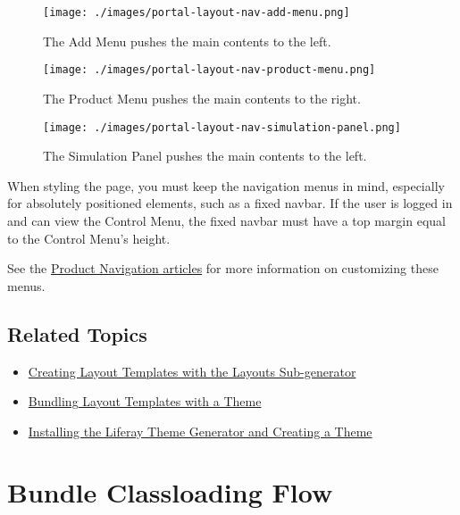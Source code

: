 \begin{figure}
\centering
\texttt{[image: ./images/portal-layout-nav-add-menu.png]}
\caption{The Add Menu pushes the main contents to the left.}
\end{figure}

\begin{figure}
\centering
\texttt{[image: ./images/portal-layout-nav-product-menu.png]}
\caption{The Product Menu pushes the main contents to the right.}
\end{figure}

\begin{figure}
\centering
\texttt{[image: ./images/portal-layout-nav-simulation-panel.png]}
\caption{The Simulation Panel pushes the main contents to the left.}
\end{figure}

When styling the page, you must keep the navigation menus in mind,
especially for absolutely positioned elements, such as a fixed navbar.
If the user is logged in and can view the Control Menu, the fixed navbar
must have a top margin equal to the Control Menu's height.

See the
\href{/docs/7-2/customization/-/knowledge_base/c/product-navigation}{Product
Navigation articles} for more information on customizing these menus.

\section{Related Topics}\label{related-topics-13}

\begin{itemize}
\tightlist
\item
  \href{/docs/7-2/reference/-/knowledge_base/r/creating-layout-templates-with-the-themes-generator}{Creating
  Layout Templates with the Layouts Sub-generator}
\item
  \href{/docs/7-2/frameworks/-/knowledge_base/f/including-layout-templates-with-a-theme}{Bundling
  Layout Templates with a Theme}
\item
  \href{/docs/7-2/reference/-/knowledge_base/r/installing-the-theme-generator-and-creating-a-theme}{Installing
  the Liferay Theme Generator and Creating a Theme}
\end{itemize}

\chapter{Bundle Classloading Flow}\label{bundle-classloading-flow}

